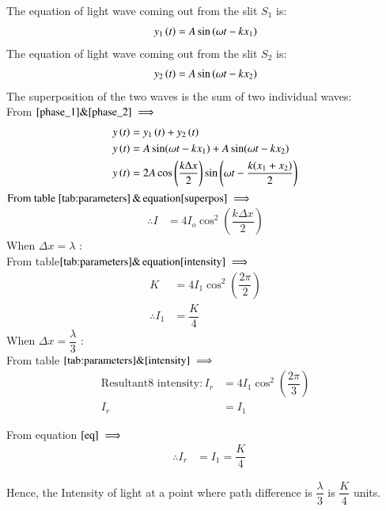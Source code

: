 \documentclass[journal,12pt,twocolumn]{IEEEtran}
\theoremstyle{remark}
\begin{document}
The equation of light wave coming out from the slit $S_1$ is:
\begin{align}
    y_1\left(t\right) = A\sin{(\omega t - kx_1)} \label{phase_1}
\end{align}
The equation of light wave coming out from the slit $S_2$ is:
\begin{align}
     y_2\left(t\right) = A\sin{(\omega t - kx_2)} \label{phase_2}
\end{align}
The superposition of the two waves is the sum of two individual waves: \\
From $\eqref{phase_1} \& \eqref{phase_2} \implies$
\begin{align}
y\left(t\right) &= y_1\left(t\right) + y_2\left(t\right)  \\
y\left(t\right) &= A\sin({\omega t - kx_1})  + A\sin({ \omega t - kx_2}) \nonumber \\
y\left(t\right) &=  2A\cos\left(\dfrac{k\Delta x}{2}\right)\sin\left(\omega t - \dfrac{k(x_1+x_2)}{2} \right) \label{superpos}
\end{align}
$\text{From table }\eqref{tab:parameters}\, \& \,\text{equation}\eqref{superpos} \implies $ 
\begin{align}
\therefore I &= 4I_o\cos^2\left(\dfrac{k\Delta x}{2}\right)  \label{intensity}
\end{align}
When $\Delta x = \lambda$ : \\
From table$ \eqref{tab:parameters} \& \,\text{equation}\eqref{intensity} \implies$ 
\begin{align}
  K &= 4I_1\cos^2\left(\dfrac{2\pi}{2}\right)  \\
 \therefore I_1&=\dfrac{K}{4} \label{eq}
\end{align}
When $\Delta x = \dfrac{\lambda}{3}$ : \\
From table $\eqref{tab:parameters} \& \eqref{intensity} \implies$ 
\begin{align}
\text{Resultant8 intensity}:I_r &= 4I_1\cos^2\left(\dfrac{2\pi}{3}\right) \\
I_r &= I_1
\end{align}

From equation $ \eqref{eq} \implies$
\hspace*{0.5cm}
\begin{align}
 \,\,\,\, \therefore I_r &= I_1 =\dfrac{K}{4} 
\end{align}

Hence, the Intensity of light at a point where path difference is $\dfrac{\lambda}{3}$ is $\dfrac{K}{4}$ units.


\end{document}
